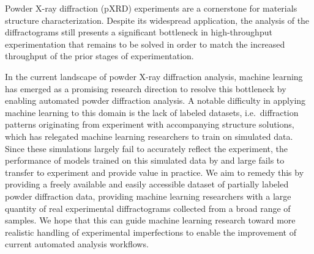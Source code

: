 Powder X-ray diffraction (pXRD) experiments are a cornerstone for materials structure characterization.
Despite its widespread application, the analysis of the diffractograms still presents a significant bottleneck
in high-throughput experimentation that remains to be solved in order to match the increased throughput
of the prior stages of experimentation. \cite{raClassificationCrystalStructures2021}

In the current landscape of powder X-ray diffraction analysis, machine learning has emerged as a promising research direction to resolve this bottleneck by enabling automated powder diffraction analysis.
A notable difficulty in applying machine learning to this domain is the lack of labeled datasets, i.e.\
diffraction patterns originating from experiment with accompanying structure solutions, which has relegated machine learning
researchers to train on simulated data.
Since these simulations largely fail to accurately reflect the experiment, the performance of models trained
on this simulated data by and large fails to transfer to experiment and provide value in practice.
We aim to remedy this by providing a freely available and easily accessible dataset of partially labeled
powder diffraction data, providing machine learning researchers with a large quantity of real experimental diffractograms collected from a broad range of samples.
We hope that this can guide machine learning research toward more realistic handling of experimental imperfections to enable the improvement of current automated analysis workflows.